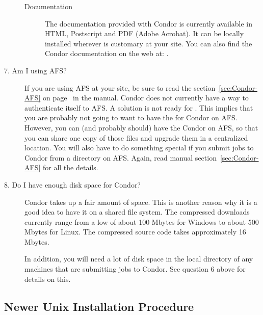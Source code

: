 \begin{description}
\begin{description}
\item[Documentation]

The documentation provided with Condor is currently available in
     HTML, Postscript and PDF (Adobe Acrobat).  It can be locally installed
     wherever is customary at your site.  You can also find the Condor
     documentation on the web at:
     .

\end{description}

\item[7. Am I using AFS?]

If you are using AFS at your site, be sure to read the
section~\ref{sec:Condor-AFS} on page~\pageref{sec:Condor-AFS} in the
manual.
Condor does not currently have a way to authenticate itself to AFS.
A solution is not ready for
\VersionNotice.
This implies that you are probably not going to want
to have the  for Condor on AFS.
However, you can
(and probably should) have the Condor  on AFS, so
that you can share one copy of those files and upgrade them in a
centralized location.  You will also have to do something special if
you submit jobs to Condor from a directory on AFS.  Again, read manual
section~\ref{sec:Condor-AFS} for all the details.

\item[8. Do I have enough disk space for Condor?]

Condor takes up a fair amount of space.
This is another reason why it is a good idea to have it on a shared
file system.
The compressed downloads currently range from a low of about 100 Mbytes
for Windows to about 500 Mbytes for Linux.
The compressed source code takes approximately 16 Mbytes.

In addition, you will need a lot of disk space in the local directory
of any machines that are submitting jobs to Condor.  See question 6
above for details on this.

\end{description}

\subsection{\label{sec:new-install-procedure}
Newer Unix Installation Procedure}


